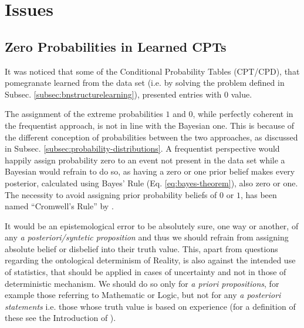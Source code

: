 \section{Issues} \label{sec:issues}

\subsection{Zero Probabilities in Learned CPTs}
It was noticed that some of the Conditional Probability Tables (CPT/CPD), that pomegranate learned from the data set (i.e. by solving the problem defined in Subsec. \ref{subsec:bnstructurelearning}), presented entries with $0$ value.

The assignment of the extreme probabilities $1$ and $0$, while perfectly coherent in the frequentist approach, is not in line with the Bayesian one.
This is because of the different conception of probabilities between the two approaches, as discussed in Subsec. \ref{subsec:probability-distributions}.
A frequentist perspective would happily assign probability zero to an event not present in the data set while a Bayesian would refrain to do so, as having a zero or one prior belief makes every posterior, calculated using Bayes' Rule (Eq. \ref{eq:bayes-theorem}), also zero or one.
The necessity to avoid assigning prior probability beliefs of $0$ or $1$, has been named \enquote{Cromwell's Rule} by \cite{Jackman2009}.

It would be an epistemological error to be absolutely sure, one way or another, of any \textit{a posteriori/syntetic proposition} and thus we should refrain from assigning absolute belief or disbelief into their truth value.
This, apart from questions regarding the ontological determinism of Reality, is also against the intended use of statistics, that should be applied in cases of uncertainty and not in those of deterministic mechanism.
We should do so only for \textit{a priori propositions}, for example those referring to Mathematic or Logic, but not for any \textit{a posteriori statements} i.e. those whose truth value is based on experience (for a definition of these see the Introduction of \cite{Kant1998}).

